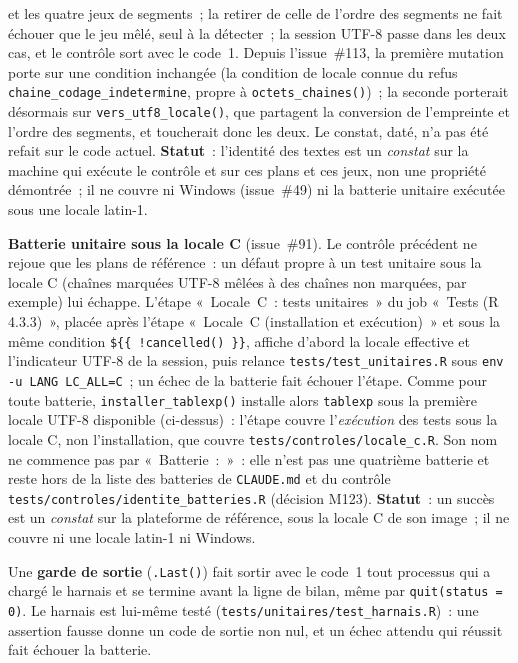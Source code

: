 \documentclass[a4paper,11pt]{article}
\newcommand{\code}[1]{\texttt{\small #1}}
\begin{document}
et les quatre jeux de segments~; la retirer de celle de l'ordre des segments
ne fait échouer que le jeu mêlé, seul à la détecter~; la session UTF-8 passe
dans les deux cas, et le contrôle sort avec le code~1. Depuis
l'issue~\#113, la première mutation porte sur une condition inchangée (la
condition de locale connue du refus \code{chaine\_codage\_indetermine},
propre à \code{octets\_chaines()})~; la seconde porterait désormais sur
\code{vers\_utf8\_locale()}, que partagent la conversion de l'empreinte et
l'ordre des segments, et toucherait donc les deux. Le constat, daté, n'a pas
été refait sur le code actuel.
\textbf{Statut}~: l'identité des textes est un \emph{constat} sur la
machine qui exécute le contrôle et sur ces plans et ces jeux, non une
propriété démontrée~; il ne couvre ni Windows (issue~\#49) ni la batterie
unitaire exécutée sous une locale latin-1.

\medskip
\noindent
\textbf{Batterie unitaire sous la locale C} (issue~\#91). Le contrôle
précédent ne rejoue que les plans de référence~: un défaut propre à un
test unitaire sous la locale C (chaînes marquées UTF-8 mêlées à des chaînes
non marquées, par exemple) lui échappe. L'étape «~Locale~C~: tests
unitaires~» du job «~Tests (R 4.3.3)~», placée après l'étape «~Locale~C
(installation et exécution)~» et sous la même condition
\code{\$\{\{ !cancelled() \}\}}, affiche d'abord la locale effective et
l'indicateur UTF-8 de la session, puis relance
\code{tests/test\_unitaires.R} sous \code{env -u LANG LC\_ALL=C}~; un échec
de la batterie fait échouer l'étape. Comme pour toute batterie,
\code{installer\_tablexp()} installe alors \code{tablexp} sous la première
locale UTF-8 disponible (ci-dessus)~: l'étape couvre l'\emph{exécution} des
tests sous la locale C, non l'installation, que couvre
\code{tests/controles/locale\_c.R}. Son nom ne commence pas par
«~Batterie~:~»~: elle n'est pas une quatrième batterie et reste hors de la
liste des batteries de \code{CLAUDE.md} et du contrôle
\code{tests/controles/identite\_batteries.R} (décision M123).
\textbf{Statut}~: un succès est un \emph{constat} sur la plateforme de
référence, sous la locale C de son image~; il ne couvre ni une locale
latin-1 ni Windows.

\medskip
\noindent
Une \textbf{garde de sortie} (\code{.Last()}) fait sortir avec le code~1 tout
processus qui a chargé le harnais et se termine avant la ligne de bilan, même
par \code{quit(status = 0)}. Le harnais est lui-même testé
(\code{tests/unitaires/test\_harnais.R})~: une assertion fausse donne un code
de sortie non nul, et un échec attendu qui réussit fait échouer la batterie.
\end{document}
